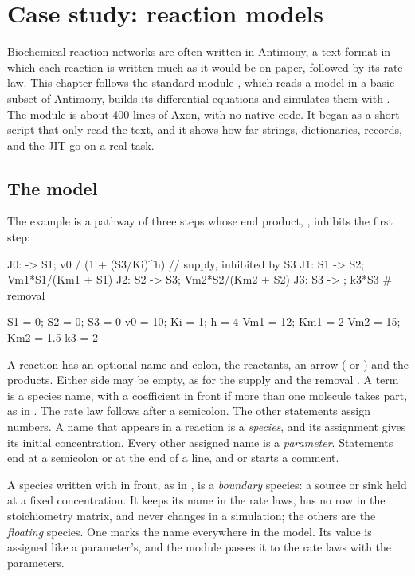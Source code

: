 \documentclass[11pt,a4paper,openany]{report}
\begin{document}
{{%
\chapter{Case study: reaction models}\label{ch:antimony}

Biochemical reaction networks are often written in Antimony, a text format in
which each reaction is written much as it would be on paper, followed by its
rate law. This chapter follows the standard module , which reads
a model in a basic subset of Antimony, builds its differential equations and
simulates them with . The module is about 400 lines of Axon,
with no native code. It began as a short script that only read the text, and
it shows how far strings, dictionaries, records,  and the
JIT go on a real task.

\section{The model}

The example is a pathway of three steps whose end product, , inhibits
the first step:

\begin{shell}
J0: -> S1;      v0 / (1 + (S3/Ki)^h)    // supply, inhibited by S3
J1: S1 -> S2;   Vm1*S1/(Km1 + S1)
J2: S2 -> S3;   Vm2*S2/(Km2 + S2)
J3: S3 -> ;     k3*S3                   # removal

S1 = 0; S2 = 0; S3 = 0
v0 = 10; Ki = 1; h = 4
Vm1 = 12; Km1 = 2
Vm2 = 15; Km2 = 1.5
k3 = 2
\end{shell}

A reaction has an optional name and colon, the reactants, an arrow
(\code{->} or \code{=>}) and the products. Either side may be empty, as for
the supply  and the removal . A term is a species name,
with a coefficient in front if more than one molecule takes part, as in
. The rate law follows after a semicolon. The other statements
assign numbers. A name that appears in a reaction is a \emph{species}, and its
assignment gives its initial concentration. Every other assigned name is a
\emph{parameter}. Statements end at a semicolon or at the end of a line, and
\code{//} or \code{#} starts a comment.

A species written with \code{$} in front, as in , is
a \emph{boundary} species: a source or sink held at a fixed concentration.
It keeps its name in the rate laws, has no row in the stoichiometry matrix,
and never changes in a simulation; the others are the \emph{floating}
species. One \code{$} marks the name everywhere in the model. Its value is
assigned like a parameter's, and the module passes it to the rate laws with
the parameters.

}}
\end{document}
